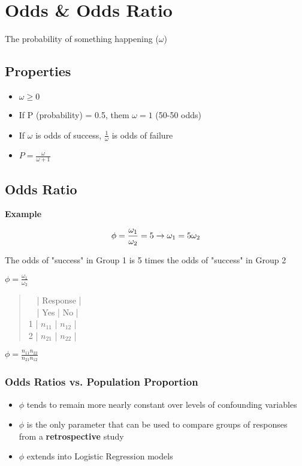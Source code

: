 \documentclass[11pt]{article}
\begin{document}
\section{Odds \& Odds Ratio}
\label{sec:org485f9c2}
The probability of something happening (\(\omega\))

\subsection{Properties}
\label{sec:org00b3400}
\begin{itemize}
\item \(\omega \geq 0\)
\item If P (probability) = 0.5, them \(\omega = 1\) (50-50 odds)
\item If \(\omega\) is odds of success, \(\frac{1}{\omega}\) is odds of failure
\item \(P = \frac{\omega}{\omega + 1}\)
\end{itemize}

\subsection{Odds Ratio}
\label{sec:orgcc6c55a}
\textbf{Example}

$$
    \phi = \frac{\omega_1}{\omega_2} = 5 \newline 
    \to \omega_1 = 5\omega_2
$$

The odds of "success" in Group 1 is 5 times the odds of "success" in
Group 2

\(\phi = \frac{\omega_1}{\omega_2}\)

\begin{verse}
  | Response |\\
  | Yes | No |\\
1 | \(n_{11}\) | \(n_{12}\) |\\
2 | \(n_{21}\) | \(n_{22}\) |\\
\end{verse}

\(\phi = \frac{n_{11}n_{22}}{n_{21}n_{12}}\)

\subsubsection{Odds Ratios vs. Population Proportion}
\label{sec:org00212d3}
\begin{itemize}
\item \(\phi\) tends to remain more nearly constant over levels of
confounding variables
\item \(\phi\) is the only parameter that can be used to compare groups of
responses from a \textbf{retrospective} study
\item \(\phi\) extends into Logistic Regression models
\end{itemize}
\end{document}
